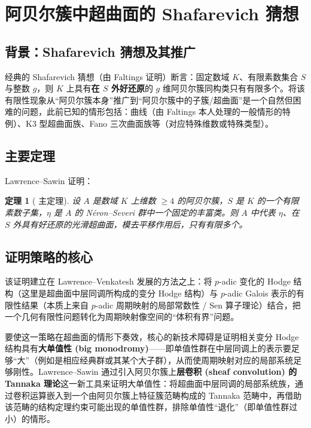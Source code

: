 \documentclass[11pt,a4paper]{article}
\newtheorem{theorem}{定理}[section]
\theoremstyle{definition}
\theoremstyle{remark}
\begin{document}
\section{阿贝尔簇中超曲面的 Shafarevich 猜想}

\subsection{背景：Shafarevich 猜想及其推广}

经典的 Shafarevich 猜想（由 Faltings \cite{Faltings1983} 证明）断言：固定数域 $K$、有限素数集合 $S$ 与整数 $g$，则 $K$ 上具有\textbf{在 $S$ 外好还原}的 $g$ 维阿贝尔簇同构类只有有限多个。将该有限性现象从“阿贝尔簇本身”推广到“阿贝尔簇中的子簇/超曲面”是一个自然但困难的问题，此前已知的情形包括：曲线（由 Faltings 本人处理的一般情形的特例）、K3 型超曲面族、Fano 三次曲面族等（对应特殊维数或特殊类型）。

\subsection{主要定理}

Lawrence--Sawin \cite{LS2025} 证明：

\begin{theorem}[\cite{LS2025} 主定理]
设 $A$ 是数域 $K$ 上维数 $\ge 4$ 的阿贝尔簇，$S$ 是 $K$ 的一个有限素数子集，$\eta$ 是 $A$ 的 Néron--Severi 群中一个固定的丰富类。则 $A$ 中代表 $\eta$、在 $S$ 外具有好还原的光滑超曲面，模去平移作用后，只有有限多个。
\end{theorem}

\subsection{证明策略的核心}

该证明建立在 Lawrence--Venkatesh \cite{LV2020} 发展的方法之上：将 $p$-adic 变化的 Hodge 结构（这里是超曲面中层同调所构成的变分 Hodge 结构）与 $p$-adic Galois 表示的有限性结果（本质上来自 $p$-adic 周期映射的局部常数性 / Sen 算子理论）结合，把一个几何有限性问题转化为周期映射像空间的“体积有界”问题。

要使这一策略在超曲面的情形下奏效，核心的新技术障碍是证明相关变分 Hodge 结构具有\textbf{大单值性 (big monodromy)}——即单值性群在中层同调上的表示要足够“大”（例如是相应经典群或其某个大子群），从而使周期映射对应的局部系统足够刚性。Lawrence--Sawin 通过引入阿贝尔簇上\textbf{层卷积 (sheaf convolution) 的 Tannaka 理论}这一新工具来证明大单值性：将超曲面中层同调的局部系统族，通过卷积运算嵌入到一个由阿贝尔簇上特征簇范畴构成的 Tannaka 范畴中，再借助该范畴的结构定理约束可能出现的单值性群，排除单值性“退化”（即单值性群过小）的情形。
\end{document}
